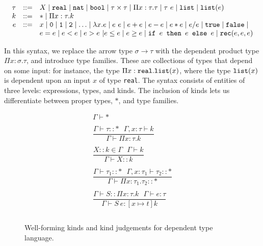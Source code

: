  \[
\begin{array}{rcl}
\tau &::=& X \mid \texttt{real} \mid \texttt{nat} \mid \texttt{bool} \mid \tau \times \tau \mid \Pi x:\tau.\tau
\mid \tau \ e \mid \texttt{list} \mid \texttt{list}(e) \\
k &::=& * \mid \Pi x : \tau.k \\
e &::=& x  \mid \texttt{0} \mid \texttt{1} \mid \texttt{2} \mid \dotsc \mid \lambda x.e \mid e \ e \mid e + e \mid e - e \mid  e  *  e \mid e / e \mid \texttt{true} \mid \texttt{false} \mid \\
  && e  =  e \mid e < e \mid e > e \ | e \leq e \mid e \geq e \mid 
     \texttt{if } e \texttt{ then } e \texttt{ else } e \mid \texttt{rec}(e, e, e) 
\end{array}
\]

In this syntax, we replace the arrow type $\sigma \rightarrow \tau$ with the dependent product type
$\Pi x:\sigma.\tau$, and introduce type families. These are collections of types that depend on some input: for instance,
the type $\Pi x:\texttt{real}.\texttt{list}(x)$, where the type $\texttt{list}(x)$ is dependent upon an input $x$ of type \texttt{real}.
The syntax consists of entities of three levels: expressions, types, and kinds. The inclusion of kinds lets us
differentiate between proper types, $*$, and type families.

\begin{figure}
\[
\begin{array}{c}
\Gamma \vdash * \\ \\
\dfrac{\Gamma \vdash \tau :: * \ \ \ \Gamma,x:\tau \vdash k}{\Gamma \vdash \Pi x:\tau.k} \\ \\

\dfrac{X :: k \in \Gamma \ \ \ \Gamma \vdash k}{\Gamma \vdash X :: k} \\ \\
\dfrac{\Gamma \vdash \tau_1 :: * \ \ \ \Gamma, x:\tau_1 \vdash \tau_2 :: *}{\Gamma \vdash \Pi x:\tau_1.\tau_2 :: *} \\ \\
\dfrac{\Gamma \vdash S :: \Pi x:\tau.k \ \ \ \Gamma \vdash e : \tau}{\Gamma \vdash S \ e : [x \mapsto t]k} \\ \\
\end{array}
\]
\caption{Well-forming kinds and kind judgements for dependent type language.}
\end{figure}

